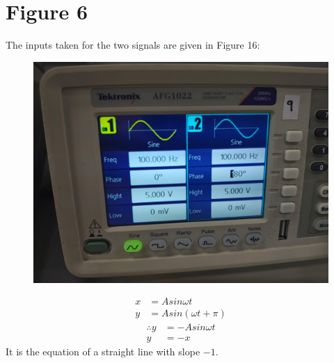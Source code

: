 \documentclass[a4paper,12pt]{article}
\numberwithin{equation}{section} %
\begin{document}
\section{Figure 6}
The inputs taken for the two signals are given in Figure 16:
\begin{figure}[h!]
    \centering
    \includegraphics[width=0.5\linewidth]{Tables/Table4.jpeg} 
    \caption{}
\end{figure}
\begin{align}
    x&=Asin{\omega t}\\
    y&=Asin{(\omega t+\pi)}
\end{align}
\begin{align}
    \therefore y&=-Asin{\omega t}\\
    y&=-x
\end{align}
It is the equation of a straight line with slope $-1$.
\end{document}
